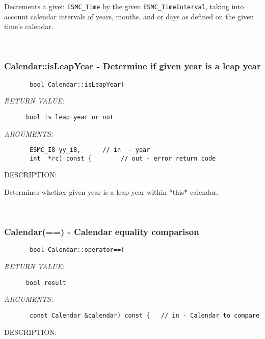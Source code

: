        Decrements a given {\tt ESMC\_Time} by the given
       {\tt ESMC\_TimeInterval}, taking into account calendar intervals of
       years, months, and or days as defined on the given time's calendar.
   
 
\mbox{}\hrulefill\ 
 
\subsubsection [Calendar::isLeapYear] {Calendar::isLeapYear - Determine if given year is a leap year}


  
\begin{verbatim}       bool Calendar::isLeapYear(\end{verbatim}{\em RETURN VALUE:}
\begin{verbatim}      bool is leap year or not\end{verbatim}{\em ARGUMENTS:}
\begin{verbatim}       ESMC_I8 yy_i8,      // in  - year
       int  *rc) const {        // out - error return code\end{verbatim}
{\sf DESCRIPTION:\\ }


       Determines whether given year is a leap year within *this* calendar.
   
 
\mbox{}\hrulefill\ 
 
\subsubsection [Calendar(==)] {Calendar(==) - Calendar equality comparison}


  
\begin{verbatim}       bool Calendar::operator==(\end{verbatim}{\em RETURN VALUE:}
\begin{verbatim}      bool result\end{verbatim}{\em ARGUMENTS:}
\begin{verbatim}       const Calendar &calendar) const {   // in - Calendar to compare\end{verbatim}
{\sf DESCRIPTION:\\ }


